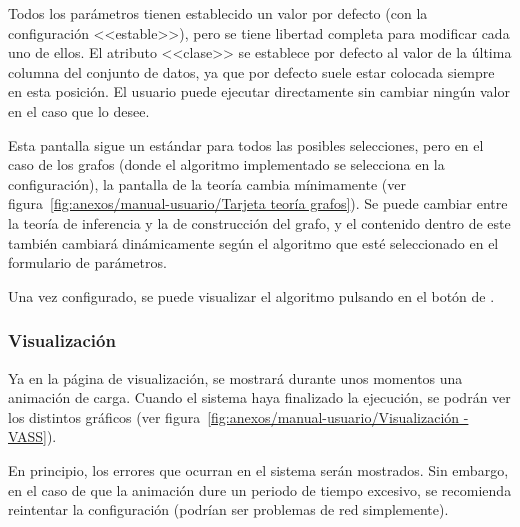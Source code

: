 
Todos los parámetros tienen establecido un valor por defecto (con la
configuración <<estable>>), pero se tiene libertad completa para modificar cada
uno de ellos. El atributo <<clase>> se establece por defecto al valor de la última columna del conjunto de datos, ya que por defecto suele estar colocada siempre en esta posición. El usuario puede ejecutar directamente sin cambiar ningún valor en el caso que lo desee.

Esta pantalla sigue un estándar para todos las posibles selecciones, pero en el caso de los grafos (donde el algoritmo implementado se selecciona en la configuración), la pantalla de la teoría cambia mínimamente (ver figura~\ref{fig:anexos/manual-usuario/Tarjeta teoría grafos}). Se puede cambiar entre la teoría de inferencia y la de construcción del grafo, y el contenido dentro de este también cambiará dinámicamente según el algoritmo que esté seleccionado en el formulario de parámetros.


Una vez configurado, se puede visualizar el algoritmo pulsando en el botón de
.

\subsubsection{Visualización}
\label{mu:visualizacion}
Ya en la página de visualización, se mostrará durante unos momentos una animación de carga. Cuando el sistema haya finalizado la ejecución, se podrán ver los distintos gráficos (ver figura~\ref{fig:anexos/manual-usuario/Visualización - VASS}).

En principio, los errores que ocurran en el sistema serán mostrados. Sin embargo, en el caso de que la animación dure un periodo de tiempo excesivo, se recomienda reintentar la configuración (podrían ser problemas de red simplemente).

